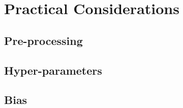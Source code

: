 \chapter{Practical Considerations}\label{chap:practical-considerations}
\section{Pre-processing}
\section{Hyper-parameters}
\section{Bias}
